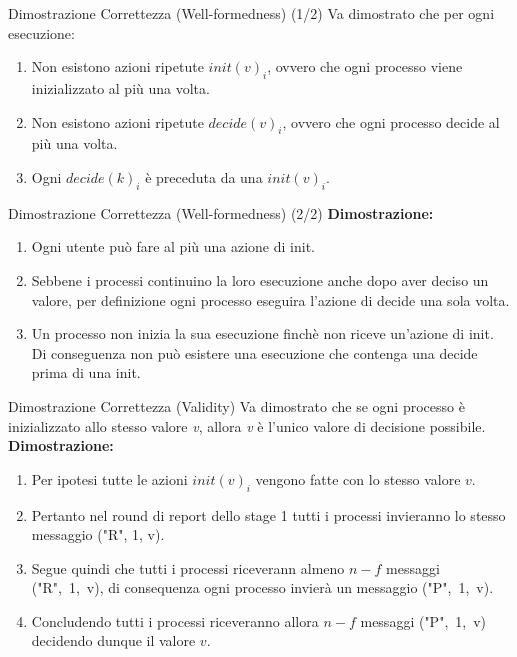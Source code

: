 \documentclass{beamer}
\begin{document}
\begin{frame}{Dimostrazione Correttezza (Well-formedness) (1/2)} %
    Va dimostrato che per ogni esecuzione:
    \begin{enumerate}
        \item Non esistono azioni ripetute $init(v)_{i}$, ovvero che ogni processo viene inizializzato al più una volta.
        \item Non esistono azioni ripetute $decide(v)_{i}$, ovvero che ogni processo decide al più una volta.
        \item Ogni $decide(k)_{i}$ è preceduta da una $init(v)_{i}$.
    \end{enumerate}
\end{frame}

\begin{frame}{Dimostrazione Correttezza (Well-formedness) (2/2)} %
    \textbf{Dimostrazione:}
    \begin{enumerate}
        \item Ogni utente può fare al più una azione di init.
        \item Sebbene i processi continuino la loro esecuzione anche dopo aver deciso un valore, per definizione ogni processo eseguira l'azione di decide una sola volta.
        \item Un processo non inizia la sua esecuzione finchè non riceve un'azione di init. Di conseguenza non può esistere una esecuzione che contenga una decide prima di una init.
    \end{enumerate}
\end{frame}

\begin{frame}{Dimostrazione Correttezza (Validity)}
    Va dimostrato che se ogni processo è inizializzato allo stesso valore \textit{v}, allora \textit{v} è l'unico valore di decisione possibile.
    \newline \newline
    \textbf{Dimostrazione:}
    \begin{enumerate}
        \item<1-> Per ipotesi tutte le azioni $init(v)_{i}$ vengono fatte con lo stesso valore $v$.
        \item<2-> Pertanto nel round di report dello stage 1 tutti i processi invieranno lo stesso messaggio {("R", 1, v)}.
        \item<3-> Segue quindi che tutti i processi riceverann almeno $n - f$ messaggi \mbox{("R", 1, v)}, di consequenza ogni processo invierà un messaggio \mbox{("P", 1, v)}.
        \item<4-> Concludendo tutti i processi riceveranno allora $n - f$ messaggi \mbox{("P", 1, v)} decidendo dunque il valore $v$.
    \end{enumerate}
\end{frame}
\end{document}
